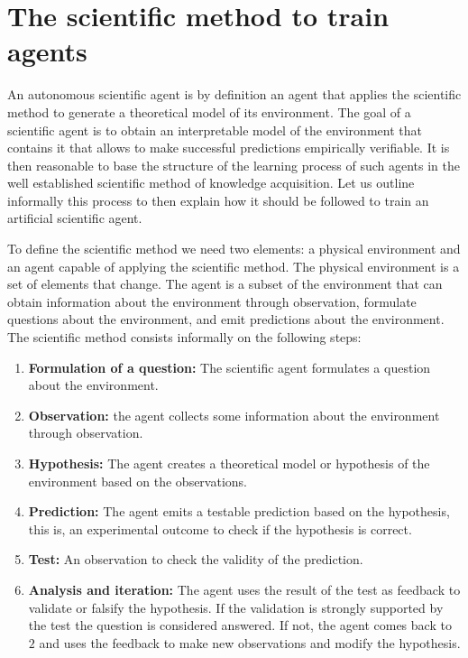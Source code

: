\documentclass[11pt,a4paper,twoside]{report}
\newcommand{\+}{\textnormal{+} }
\theoremstyle{definition}
\numberwithin{equation}{chapter}
\begin{document}
\section{The scientific method to train agents}

An autonomous scientific agent is by definition an agent that applies the
scientific method to generate a theoretical model of its environment. The goal
of a scientific agent is to obtain an interpretable model of the environment
that contains it that allows to make successful predictions empirically
verifiable. It is then reasonable to base the structure of the learning process
of such agents in the well established scientific method of knowledge
acquisition. Let us outline informally this process to then explain how it
should be followed to train an artificial scientific agent.

\par To define the scientific method we need two elements: a physical
environment and an agent capable of applying the scientific method. The physical
environment is a set of elements that change. The agent is a subset of the
environment that can obtain information about the environment through
observation, formulate questions about the environment, and emit
predictions about the environment. The scientific method consists
informally on the following steps:
\begin{enumerate}
  \item \textbf{Formulation of a question:} The scientific agent formulates a
  question about the environment.
  \item \textbf{Observation:} the agent collects some information about the
  environment through observation.
  \item  \textbf{Hypothesis:} The agent creates a theoretical model or
  hypothesis of the environment based on the observations.
  \item \textbf{Prediction:} The agent emits a testable prediction based on the
  hypothesis, this is, an experimental outcome to check if the hypothesis is
  correct.
  \item \textbf{Test:} An observation to check the validity of the 
  prediction.
  \item \textbf{Analysis and iteration:} The agent uses the result of the test
  as feedback to validate or falsify the hypothesis. If the validation is 
  strongly supported by the test the question is considered answered. 
  If not, the agent comes back to $2$ and uses the feedback to make new
  observations and modify the hypothesis.
\end{enumerate}
\end{document}
